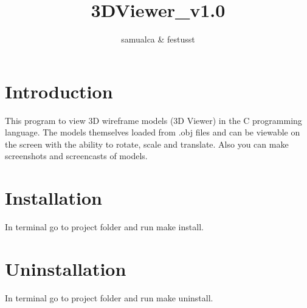 \documentclass{article}
\title{3DViewer_v1.0}
\author{samualca & festusst}
\begin{document}
\maketitle

\section{Introduction}

This program to view 3D wireframe models (3D Viewer) in the C programming language. The models themselves loaded from .obj files and can be viewable on the screen with the ability to rotate, scale and translate. Also you can make screenshots and screencasts of models.

\section{Installation}

In terminal go to project folder and run make install.

\section{Uninstallation}

In terminal go to project folder and run make uninstall.
\end{document}
